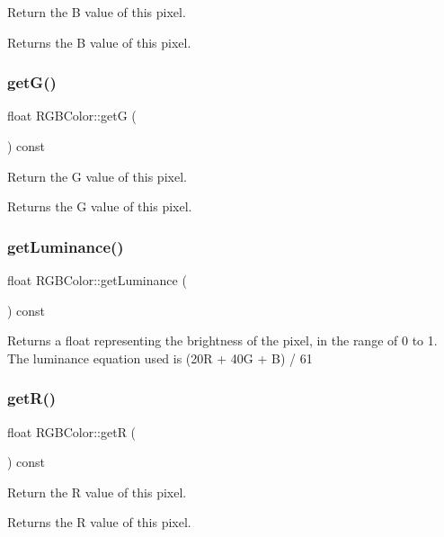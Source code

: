 Return the B value of this pixel. \begin{DoxyReturn}{Returns}
the B value of this pixel. 
\end{DoxyReturn}
\mbox{\label{classRGBColor_ada2cef91231face94996d7ebe53453ed}} 
\subsubsection{\texorpdfstring{get\+G()}{getG()}}
{\footnotesize\ttfamily float R\+G\+B\+Color\+::getG (\begin{DoxyParamCaption}{ }\end{DoxyParamCaption}) const}

Return the G value of this pixel. \begin{DoxyReturn}{Returns}
the G value of this pixel. 
\end{DoxyReturn}
\mbox{\label{classRGBColor_ab521d09d138ac4dc61adcc45a025a138}} 
\subsubsection{\texorpdfstring{get\+Luminance()}{getLuminance()}}
{\footnotesize\ttfamily float R\+G\+B\+Color\+::get\+Luminance (\begin{DoxyParamCaption}{ }\end{DoxyParamCaption}) const}

Returns a float representing the brightness of the pixel, in the range of 0 to 1. The luminance equation used is (20R + 40G + B) / 61 \mbox{\label{classRGBColor_a560c099c82f20f847208aa05091512ff}} 
\subsubsection{\texorpdfstring{get\+R()}{getR()}}
{\footnotesize\ttfamily float R\+G\+B\+Color\+::getR (\begin{DoxyParamCaption}{ }\end{DoxyParamCaption}) const}

Return the R value of this pixel. \begin{DoxyReturn}{Returns}
the R value of this pixel. 
\end{DoxyReturn}
\mbox{\label{classRGBColor_a9008f6aaf9a9374eeaaa8b73c4fc84ee}} 
